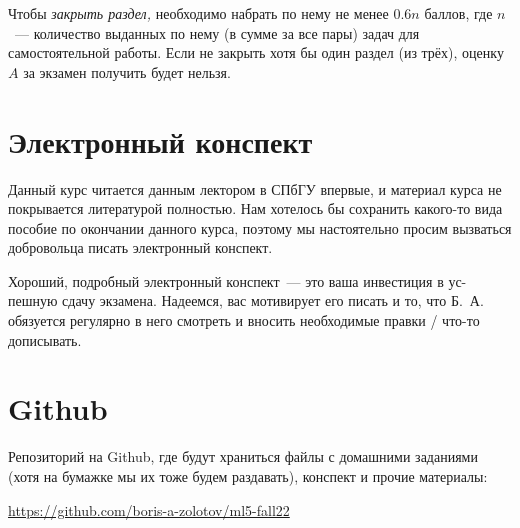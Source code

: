 \documentclass[a4paper,12pt]{article}
\begin{document}
	Чтобы {\it закрыть раздел,} необходимо набрать по нему не менее \(0.6 n\) баллов, где \(n\)~— количество выданных по нему (в сумме за все пары) задач для самостоятельной работы. Если не закрыть хотя бы один раздел (из трёх), оценку \(A\) за экзамен получить будет нельзя.

\section{Электронный конспект}

	Данный курс читается данным лектором в СПбГУ впервые, и материал курса не покрывается литературой полностью. Нам хотелось бы сохранить какого-то вида пособие по окончании данного курса, поэтому мы настоятельно просим вызваться добровольца писать электронный конспект.

	Хороший, подробный электронный конспект~— это ваша инвестиция в ус-\linebreak пешную сдачу экзамена. Надеемся, вас мотивирует его писать и то, что Б.~А. обязуется регулярно в него смотреть и вносить необходимые правки / что-то дописывать.\hspace{4cm} \textcolor{white}{\cite{shen2,shen3,katlend,lavrmaks,shenfield}}

\section{Github}

	Репозиторий на Github, где будут храниться файлы с домашними заданиями (хотя на бумажке мы их тоже будем раздавать), конспект и прочие материалы:

  \begin{center}
	\url{https://github.com/boris-a-zolotov/ml5-fall22}
  \end{center}



\end{document}
